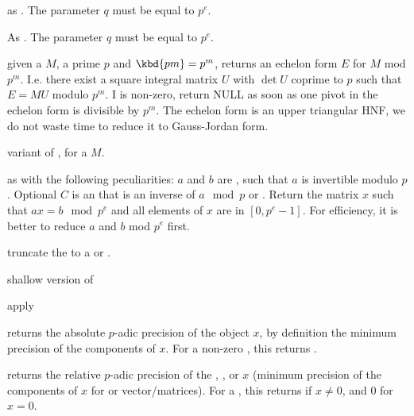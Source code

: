 as . The parameter $q$ must be equal to $p^e$.

As . The parameter $q$ must be equal to $p^e$.






 given a
 $M$, a prime $p$ and $\kbd{pm} = p^m$, returns an echelon form
$E$ for $M$ mod $p^m$. I.e. there exist a square integral matrix $U$ with
$\det U$ coprime to $p$ such that $E = MU$ modulo $p^m$. I
 is non-zero, return NULL as soon as one pivot in
the echelon form is divisible by $p^m$. The echelon form is an upper
triangular HNF, we do not waste time to reduce it to Gauss-Jordan form.

variant of , for a  $M$.

 as 
with the following peculiarities: $a$ and $b$ are , such that $a$ is
invertible modulo $p$. Optional $C$ is an  that is an inverse of
$a\mod p$ or . Return the matrix $x$ such that $ax=b\mod p^e$ and
all elements of $x$ are in $[0,p^e-1]$. For efficiency, it is better
to reduce $a$ and $b$ mod $p^e$ first.

 truncate the  to a  or
.

 shallow version of 

 apply 

 returns the absolute $p$-adic precision of
the object $x$, by definition the minimum precision of the components of $x$.
For a non-zero , this returns .

 returns the relative $p$-adic
precision of the , , or  $x$ (minimum precision
of the components of $x$ for  or vector/matrices).
For a , this returns  if $x\neq0$, and $0$ for $x=0$.

